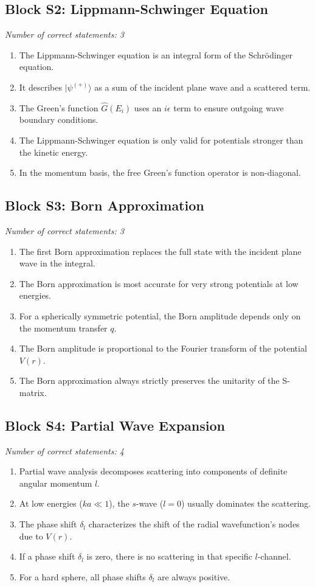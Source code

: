 \documentclass[a4paper,12pt]{article}
\begin{document}
\subsection*{Block S2: Lippmann-Schwinger Equation}
\textit{Number of correct statements: 3}
\begin{enumerate}[label=\roman*.]
    \item The Lippmann-Schwinger equation is an integral form of the Schrödinger equation.
    \item It describes $|\psi^{(+)}\rangle$ as a sum of the incident plane wave and a scattered term.
    \item The Green's function $\hat{G}(E_i)$ uses an $i\epsilon$ term to ensure outgoing wave boundary conditions.
    \item The Lippmann-Schwinger equation is only valid for potentials stronger than the kinetic energy.
    \item In the momentum basis, the free Green's function operator is non-diagonal.
\end{enumerate}

\subsection*{Block S3: Born Approximation}
\textit{Number of correct statements: 3}
\begin{enumerate}[label=\roman*.]
    \item The first Born approximation replaces the full state with the incident plane wave in the integral.
    \item The Born approximation is most accurate for very strong potentials at low energies.
    \item For a spherically symmetric potential, the Born amplitude depends only on the momentum transfer $q$.
    \item The Born amplitude is proportional to the Fourier transform of the potential $V(r)$.
    \item The Born approximation always strictly preserves the unitarity of the S-matrix.
\end{enumerate}

\subsection*{Block S4: Partial Wave Expansion}
\textit{Number of correct statements: 4}
\begin{enumerate}[label=\roman*.]
    \item Partial wave analysis decomposes scattering into components of definite angular momentum $l$.
    \item At low energies ($ka \ll 1$), the $s$-wave ($l=0$) usually dominates the scattering.
    \item The phase shift $\delta_l$ characterizes the shift of the radial wavefunction's nodes due to $V(r)$.
    \item If a phase shift $\delta_l$ is zero, there is no scattering in that specific $l$-channel.
    \item For a hard sphere, all phase shifts $\delta_l$ are always positive.
\end{enumerate}
\end{document}
